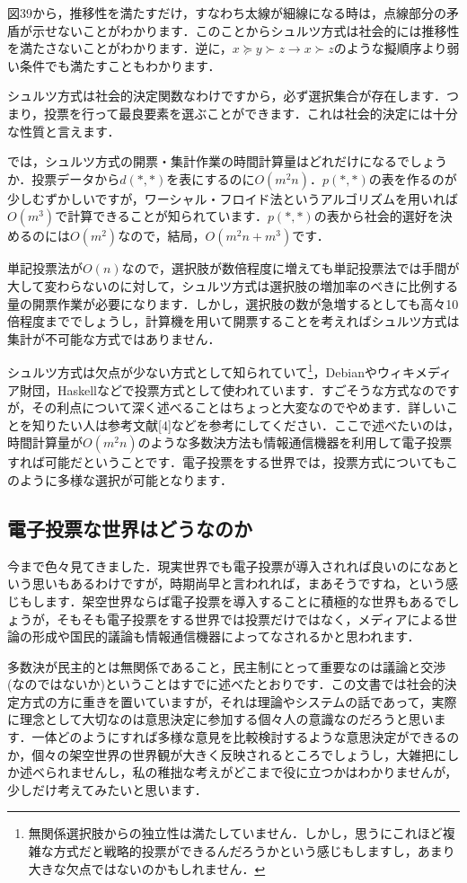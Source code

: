 図39から，推移性を満たすだけ，すなわち太線が細線になる時は，点線部分の矛盾が示せないことがわかります．このことからシュルツ方式は社会的には推移性を満たさないことがわかります．逆に，$x \succeq y \succ z \to x \succ z$のような擬順序より弱い条件でも満たすこともわかります．

シュルツ方式は社会的決定関数なわけですから，必ず選択集合が存在します．つまり，投票を行って最良要素を選ぶことができます．これは社会的決定には十分な性質と言えます．

では，シュルツ方式の開票・集計作業の時間計算量はどれだけになるでしょうか．投票データから$d(*,*)$を表にするのに$O(m^2 n)$．$p(*,*)$の表を作るのが少しむずかしいですが，ワーシャル・フロイド法というアルゴリズムを用いれば$O(m^3)$で計算できることが知られています．$p(*,*)$の表から社会的選好を決めるのには$O(m^2)$なので，結局，$O(m^2 n + m^3)$です．

単記投票法が$O(n)$なので，選択肢が数倍程度に増えても単記投票法では手間が大して変わらないのに対して，シュルツ方式は選択肢の増加率のべきに比例する量の開票作業が必要になります．しかし，選択肢の数が急増するとしても高々10倍程度まででしょうし，計算機を用いて開票することを考えればシュルツ方式は集計が不可能な方式ではありません．

シュルツ方式は欠点が少ない方式として知られていて\footnote{無関係選択肢からの独立性は満たしていません．しかし，思うにこれほど複雑な方式だと戦略的投票ができるんだろうかという感じもしますし，あまり大きな欠点ではないのかもしれません．}，Debianやウィキメディア財団，Haskellなどで投票方式として使われています．すごそうな方式なのですが，その利点について深く述べることはちょっと大変なのでやめます．詳しいことを知りたい人は参考文献[4]などを参考にしてください．ここで述べたいのは，時間計算量が$O(m^2 n)$のような多数決方法も情報通信機器を利用して電子投票すれば可能だということです．電子投票をする世界では，投票方式についてもこのように多様な選択が可能となります．

\subsection{電子投票な世界はどうなのか}
今まで色々見てきました．現実世界でも電子投票が導入されれば良いのになあという思いもあるわけですが，時期尚早と言われれば，まあそうですね，という感じもします．架空世界ならば電子投票を導入することに積極的な世界もあるでしょうが，そもそも電子投票をする世界では投票だけではなく，メディアによる世論の形成や国民的議論も情報通信機器によってなされるかと思われます．

多数決が民主的とは無関係であること，民主制にとって重要なのは議論と交渉(なのではないか)ということはすでに述べたとおりです．この文書では社会的決定方式の方に重きを置いていますが，それは理論やシステムの話であって，実際に理念として大切なのは意思決定に参加する個々人の意識なのだろうと思います．一体どのようにすれば多様な意見を比較検討するような意思決定ができるのか，個々の架空世界の世界観が大きく反映されるところでしょうし，大雑把にしか述べられませんし，私の稚拙な考えがどこまで役に立つかはわかりませんが，少しだけ考えてみたいと思います．

